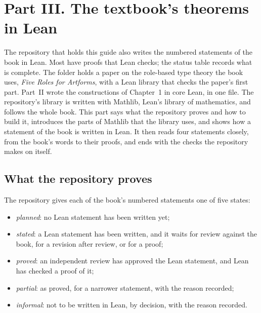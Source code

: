 \chapter*{Part III. The textbook's theorems in Lean}

The repository that holds this guide also writes the numbered statements of
the book in Lean. Most have proofs that Lean checks; the status table records
what is complete. The folder  holds a paper on the
role-based type theory the book uses, \emph{Five Roles for Artforms}, with a
Lean library that checks the paper's first part. Part~II wrote the
constructions of Chapter~1 in core Lean, in one file. The repository's
library is written with Mathlib, Lean's library of mathematics, and follows
the whole book. This part says what the repository proves and how to build
it, introduces the parts of Mathlib that the library uses, and shows how a
statement of the book is written in Lean. It then reads four statements
closely, from the book's words to their proofs, and ends with the checks the
repository makes on itself.

\section*{What the repository proves}

The repository gives each of the book's \statustotal{} numbered statements
one of five states:
\begin{itemize}[leftmargin=1.4em]
\item \emph{planned}: no Lean statement has been written yet;
\item \emph{stated}: a Lean statement has been written, and it waits for review
  against the book, for a revision after review, or for a proof;
\item \emph{proved}: an independent review has approved the Lean
  statement, and Lean has checked a proof of it;
\item \emph{partial}: as proved, for a narrower statement, with the reason
  recorded;
\item \emph{informal}: not to be written in Lean, by decision, with the
  reason recorded.
\end{itemize}

